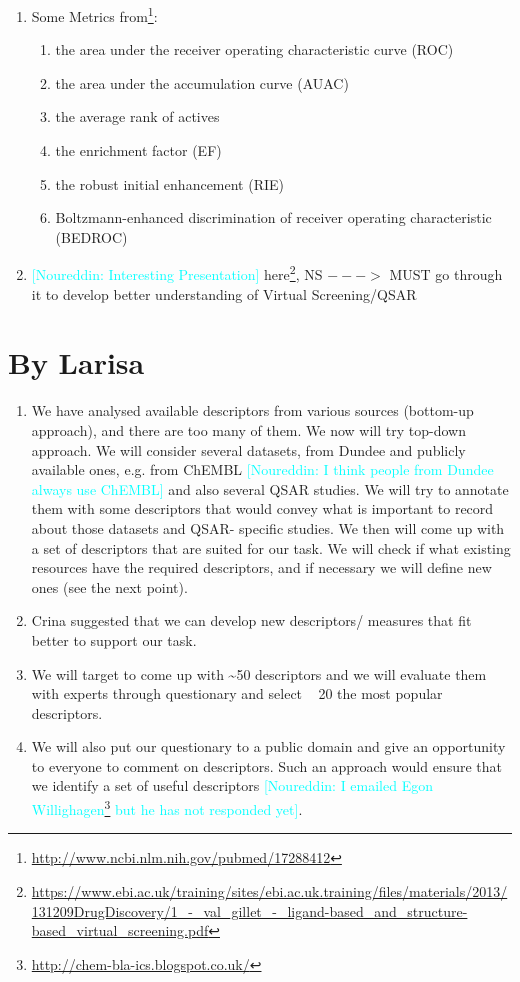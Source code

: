 \documentclass[a4paper,12pt, english]{article}
\newcommand{\kibitz}[2]{\ifnum\Comments=1\textcolor{#1}{#2}\fi}
\newcommand{\ns}[1]{\kibitz{cyan}     {[Noureddin: #1]}}
\begin{document}
\begin{enumerate}
	\item Some Metrics from\footnote{\url{http://www.ncbi.nlm.nih.gov/pubmed/17288412}}:
	\begin{enumerate}
	\item the area under the receiver operating characteristic curve (ROC)
	\item the area under the accumulation curve (AUAC)
	\item the average rank of actives
	\item the enrichment factor (EF)
	\item the robust initial enhancement (RIE)
	\item Boltzmann-enhanced discrimination of receiver operating characteristic (BEDROC)
	\end{enumerate}
	\item \ns{Interesting Presentation} here\footnote{\url{https://www.ebi.ac.uk/training/sites/ebi.ac.uk.training/files/materials/2013/131209DrugDiscovery/1_-_val_gillet_-_ligand-based_and_structure-based_virtual_screening.pdf}}, NS $--->$ MUST go through it to develop better understanding of Virtual Screening/QSAR
\end{enumerate}    

\section{By Larisa}
\begin{enumerate}
	\item We have analysed available descriptors from various sources (bottom-up approach), and there are too many of them. We now will try top-down approach. We will consider several datasets, from Dundee and publicly available ones, e.g. from ChEMBL \ns{I think people from Dundee always use ChEMBL} and also several QSAR studies. We will try to annotate them with some descriptors that would convey what is important to record about those datasets and QSAR- specific studies. We then will come up with a set of descriptors that are suited for our task. We will check if what existing resources have the required descriptors, and if necessary we will define new ones (see the next point).
	\item Crina suggested that we can develop new descriptors/ measures that fit better to support our task.
	\item We will target to come up with \textasciitilde50 descriptors and we will evaluate them with experts through questionary and select  ~ 20 the most popular descriptors.
	\item We will also put our questionary to a public domain and give an opportunity to everyone to comment on descriptors. Such an approach would ensure that we identify a set of useful descriptors \ns{I emailed Egon Willighagen\footnote{\url{http://chem-bla-ics.blogspot.co.uk/}} but he has not responded yet}.
\end{enumerate}  
\end{document}
